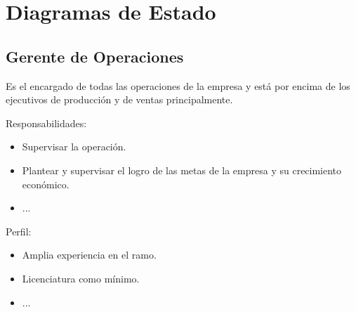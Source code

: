 \section{Diagramas de Estado}
\begin{Usuario}{\hypertarget{getenteOperaciones}{\subsection{Gerente de Operaciones}}}{
	Es el encargado de todas las operaciones de la empresa y está por encima de los ejecutivos de producción y de ventas principalmente.
}
    \item[Responsabilidades:] \cdtEmpty
    \begin{itemize}
		\item Supervisar la operación.
		\item Plantear y supervisar el logro de las metas de la empresa y su crecimiento económico.
		\item ...
    \end{itemize}

	\item[Perfil:] \cdtEmpty
    \begin{itemize}
		\item Amplia experiencia en el ramo.
		\item Licenciatura como mínimo.
		\item ...
    \end{itemize}
\end{Usuario}

